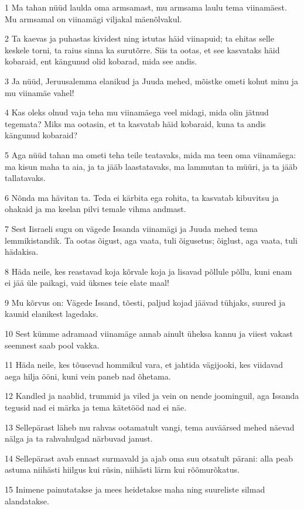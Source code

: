 \par 1 Ma tahan nüüd laulda oma armsamast, mu armsama laulu tema viinamäest. Mu armsamal on viinamägi viljakal mäenõlvakul.
\par 2 Ta kaevas ja puhastas kividest ning istutas häid viinapuid; ta ehitas selle keskele torni, ta raius sinna ka surutõrre. Siis ta ootas, et see kasvataks häid kobaraid, ent kängunud olid kobarad, mida see andis.
\par 3 Ja nüüd, Jeruusalemma elanikud ja Juuda mehed, mõistke ometi kohut minu ja mu viinamäe vahel!
\par 4 Kas oleks olnud vaja teha mu viinamäega veel midagi, mida olin jätnud tegemata? Miks ma ootasin, et ta kasvatab häid kobaraid, kuna ta andis kängunud kobaraid?
\par 5 Aga nüüd tahan ma ometi teha teile teatavaks, mida ma teen oma viinamäega: ma kisun maha ta aia, ja ta jääb laastatavaks, ma lammutan ta müüri, ja ta jääb tallatavaks.
\par 6 Nõnda ma hävitan ta. Teda ei kärbita ega rohita, ta kasvatab kibuvitsu ja ohakaid ja ma keelan pilvi temale vihma andmast.
\par 7 Sest Iisraeli sugu on vägede Issanda viinamägi ja Juuda mehed tema lemmikistandik. Ta ootas õigust, aga vaata, tuli õigusetus; õiglust, aga vaata, tuli hädakisa.
\par 8 Häda neile, kes reastavad koja kõrvale koja ja lisavad põllule põllu, kuni enam ei jää üle paikagi, vaid üksnes teie elate maal!
\par 9 Mu kõrvus on: Vägede Issand, tõesti, paljud kojad jäävad tühjaks, suured ja kaunid elanikest lagedaks.
\par 10 Sest kümme adramaad viinamäge annab ainult üheksa kannu ja viiest vakast seemnest saab pool vakka.
\par 11 Häda neile, kes tõusevad hommikul vara, et jahtida vägijooki, kes viidavad aega hilja ööni, kuni vein paneb nad õhetama.
\par 12 Kandled ja naablid, trummid ja viled ja vein on nende joominguil, aga Issanda tegusid nad ei märka ja tema kätetööd nad ei näe.
\par 13 Sellepärast läheb mu rahvas ootamatult vangi, tema auväärsed mehed näevad nälga ja ta rahvahulgad närbuvad janust.
\par 14 Sellepärast avab ennast surmavald ja ajab oma suu otsatult pärani: alla peab astuma niihästi hiilgus kui rüsin, niihästi lärm kui rõõmurõkatus.
\par 15 Inimene painutatakse ja mees heidetakse maha ning suureliste silmad alandatakse.
